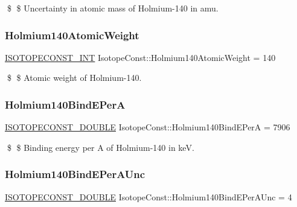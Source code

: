 \$ \$ Uncertainty in atomic mass of Holmium-\/140 in amu. \mbox{\label{group___isotope_const-_holmium-_ho140_gaee6ef67f5cd4c3b4ccc8118b2619f7ea}} 
\subsubsection{\texorpdfstring{Holmium140\+Atomic\+Weight}{Holmium140AtomicWeight}}
{\footnotesize\ttfamily \mbox{\hyperlink{group___isotope_const-_macros_ga5f18360b3e99483a35c32d789e62621c}{I\+S\+O\+T\+O\+P\+E\+C\+O\+N\+S\+T\+\_\+\+I\+NT}} Isotope\+Const\+::\+Holmium140\+Atomic\+Weight = 140}

\$ \$ Atomic weight of Holmium-\/140. \mbox{\label{group___isotope_const-_holmium-_ho140_gac400e081fa72f565cce8642ca835a426}} 
\subsubsection{\texorpdfstring{Holmium140\+Bind\+E\+PerA}{Holmium140BindEPerA}}
{\footnotesize\ttfamily \mbox{\hyperlink{group___isotope_const-_macros_ga8f45a7272ce02c0b4c65c44636ed719a}{I\+S\+O\+T\+O\+P\+E\+C\+O\+N\+S\+T\+\_\+\+D\+O\+U\+B\+LE}} Isotope\+Const\+::\+Holmium140\+Bind\+E\+PerA = 7906}

\$ \$ Binding energy per A of Holmium-\/140 in keV. \mbox{\label{group___isotope_const-_holmium-_ho140_ga77adb25da0b81d80c15593a3f9f902fc}} 
\subsubsection{\texorpdfstring{Holmium140\+Bind\+E\+Per\+A\+Unc}{Holmium140BindEPerAUnc}}
{\footnotesize\ttfamily \mbox{\hyperlink{group___isotope_const-_macros_ga8f45a7272ce02c0b4c65c44636ed719a}{I\+S\+O\+T\+O\+P\+E\+C\+O\+N\+S\+T\+\_\+\+D\+O\+U\+B\+LE}} Isotope\+Const\+::\+Holmium140\+Bind\+E\+Per\+A\+Unc = 4}

